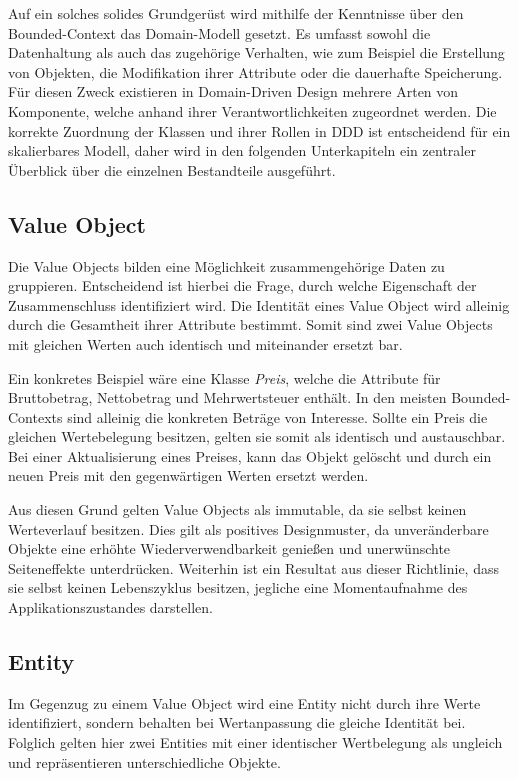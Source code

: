 Auf ein solches solides Grundgerüst wird mithilfe der Kenntnisse über den Bounded-Context das Domain-Modell gesetzt. Es umfasst sowohl die Datenhaltung als auch das zugehörige Verhalten, wie zum Beispiel die Erstellung von Objekten, die Modifikation ihrer Attribute oder die dauerhafte Speicherung. Für diesen Zweck existieren in Domain-Driven Design mehrere Arten von Komponente, welche anhand ihrer Verantwortlichkeiten zugeordnet werden. Die korrekte Zuordnung der Klassen und ihrer Rollen in DDD ist entscheidend für ein skalierbares Modell, daher wird in den folgenden Unterkapiteln ein zentraler Überblick über die einzelnen Bestandteile ausgeführt.

\subsection{Value Object}

Die Value Objects bilden eine Möglichkeit zusammengehörige Daten zu gruppieren. Entscheidend ist hierbei die Frage, durch welche Eigenschaft der Zusammenschluss identifiziert wird. Die Identität eines Value Object wird alleinig durch die Gesamtheit ihrer Attribute bestimmt. Somit sind zwei Value Objects mit gleichen Werten auch identisch und miteinander ersetzt bar. 

Ein konkretes Beispiel wäre eine Klasse \emph{Preis}, welche die Attribute für Bruttobetrag, Nettobetrag und Mehrwertsteuer enthält. In den meisten Bounded-Contexts sind alleinig die konkreten Beträge von Interesse. Sollte ein Preis die gleichen Wertebelegung besitzen, gelten sie somit als identisch und austauschbar. Bei einer Aktualisierung eines Preises, kann das Objekt gelöscht und durch ein neuen Preis mit den gegenwärtigen Werten ersetzt werden. 

Aus diesen Grund gelten Value Objects als \gls{immutable}, da sie selbst keinen Werteverlauf besitzen. Dies gilt als positives Designmuster, da unveränderbare Objekte eine erhöhte Wiederverwendbarkeit genießen und unerwünschte Seiteneffekte unterdrücken. Weiterhin ist ein Resultat aus dieser Richtlinie, dass sie selbst keinen Lebenszyklus besitzen, jegliche eine Momentaufnahme des Applikationszustandes darstellen.

\subsection{Entity}

Im Gegenzug zu einem Value Object wird eine Entity nicht durch ihre Werte identifiziert, sondern behalten bei Wertanpassung die gleiche Identität bei. Folglich gelten hier zwei Entities mit einer identischer Wertbelegung als ungleich und repräsentieren unterschiedliche Objekte.

